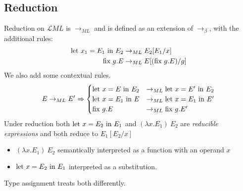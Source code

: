\subsection{Reduction}
Reduction on $\mathcal{L}{ML}$ is $\to_{ML}$ and is defined as an extension of $\to_\beta$, with the additional rules:
\[\begin{split}
    \text{let } x_1 = E_1 \text{ in } E_2 & \to_{ML} E_2[E_1/x] \\
    \text{fix } g . E & \to_{ML} E[(\text{fix } g . E)/g] \\
\end{split}\]
We also add some contextual rules.
\[E \to_{ML} E' \Rightarrow \begin{cases}
    \text{let } x = E \text{ in } E_2 &\to_{ML} \text{let } x = E' \text{ in } E_2 \\
    \text{let } x = E_1 \text{ in } E &\to_{ML} \text{let } x = E_1 \text{ in } E' \\
    \text{fix } g . E & \to_{ML} \text{fix } g . E' \\
\end{cases}\]
Under reduction both $\text{let } x = E_2 \text{ in } E_1$ and $(\lambda x . E_1) \ E_2$ are \textit{reducible expressions} and both reduce to $E_1[E_2/x]$
\begin{itemize}
    \item $(\lambda x . E_1) \ E_2$ semantically interpreted as a function with an operand $x$
    \item $\text{let } x = E_2 \text{ in } E_1$ interpreted as a substitution.
\end{itemize}
Type assignment treats both differently.

